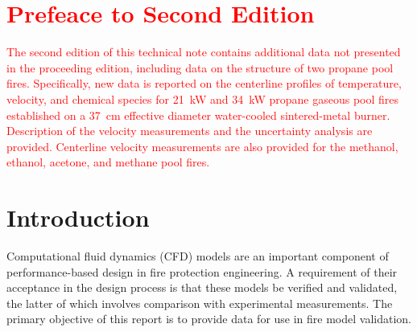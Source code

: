 \documentclass[12pt]{article}
\begin{document}

\begin{multicols}{2}
\printnomenclature
\end{multicols}

\clearpage
\section*{\textcolor{red}{Prefeace to Second Edition}}
\textcolor{red}{The second edition of this technical note contains additional data not presented in the proceeding edition, including data on the structure of two propane pool fires. Specifically, new data is reported on the centerline profiles of temperature, velocity, and chemical species for \textcolor{red}{21~kW} and 34~kW propane gaseous pool fires established on a 37~cm effective diameter water-cooled sintered-metal burner. Description of the velocity measurements and the uncertainty analysis are provided. Centerline velocity measurements are also provided for the methanol, ethanol, acetone, and methane pool fires.}

\clearpage

\section{Introduction}
\label{sec:intro}
Computational fluid dynamics (CFD) models are an important component of performance-based design in fire protection engineering. A requirement of their acceptance in the design process is that these models be verified and validated, the latter of which involves comparison with experimental measurements. The primary objective of this report is to provide data for use in fire model validation.
\end{document}
